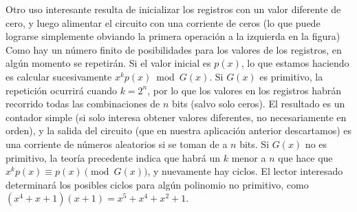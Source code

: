   Otro uso interesante resulta de inicializar los registros
  con un valor diferente de cero,
  y luego alimentar el circuito con una corriente de ceros
  (lo que puede lograrse simplemente obviando
   la primera operación a la izquierda en la figura)
  Como hay un número finito de posibilidades
  para los valores de los registros,
  en algún momento se repetirán.
  Si el valor inicial es \(p(x)\),
  lo que estamos haciendo
  es calcular sucesivamente \(x^k p(x) \bmod G(x)\).
  Si \(G(x)\) es primitivo,
  la repetición ocurrirá cuando \(k = 2^n\),
  por lo que los valores en los registros
  habrán recorrido todas las combinaciones de \(n\) bits
  (salvo solo ceros).
  El resultado es un contador simple
  (si solo interesa obtener valores diferentes,
   no necesariamente en orden),
  y la salida del circuito
  (que en nuestra aplicación anterior descartamos)
  es una corriente de números aleatorios
  si se toman de a \(n\) bits.
  Si \(G(x)\) no es primitivo,
  la teoría precedente indica que habrá un \(k\) menor a \(n\)
  que hace que \(x^k p(x) \equiv p(x) \pmod{G(x)}\),
  y nuevamente hay ciclos.
  El lector interesado determinará los posibles ciclos
  para algún polinomio no primitivo,
  como \((x^4 + x + 1) (x + 1) = x^5 + x^4 + x^2 +1\).

